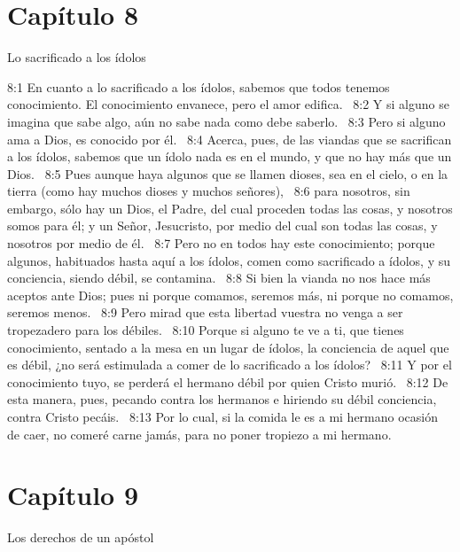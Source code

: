 \section*{Capítulo 8}
Lo sacrificado a los ídolos  

8:1 En cuanto a lo sacrificado a los ídolos, sabemos que todos tenemos conocimiento. El conocimiento envanece, pero el amor edifica.  
8:2 Y si alguno se imagina que sabe algo, aún no sabe nada como debe saberlo.  
8:3 Pero si alguno ama a Dios, es conocido por él.  
8:4 Acerca, pues, de las viandas que se sacrifican a los ídolos, sabemos que un ídolo nada es en el mundo, y que no hay más que un Dios.  
8:5 Pues aunque haya algunos que se llamen dioses, sea en el cielo, o en la tierra (como hay muchos dioses y muchos señores),  
8:6 para nosotros, sin embargo, sólo hay un Dios, el Padre, del cual proceden todas las cosas, y nosotros somos para él; y un Señor, Jesucristo, por medio del cual son todas las cosas, y nosotros por medio de él.  
8:7 Pero no en todos hay este conocimiento; porque algunos, habituados hasta aquí a los ídolos, comen como sacrificado a ídolos, y su conciencia, siendo débil, se contamina.  
8:8 Si bien la vianda no nos hace más aceptos ante Dios; pues ni porque comamos, seremos más, ni porque no comamos, seremos menos.  
8:9 Pero mirad que esta libertad vuestra no venga a ser tropezadero para los débiles.  
8:10 Porque si alguno te ve a ti, que tienes conocimiento, sentado a la mesa en un lugar de ídolos, la conciencia de aquel que es débil, ¿no será estimulada a comer de lo sacrificado a los ídolos?  
8:11 Y por el conocimiento tuyo, se perderá el hermano débil por quien Cristo murió.  
8:12 De esta manera, pues, pecando contra los hermanos e hiriendo su débil conciencia, contra Cristo pecáis.  
8:13 Por lo cual, si la comida le es a mi hermano ocasión de caer, no comeré carne jamás, para no poner tropiezo a mi hermano.  
\section*{Capítulo 9}
Los derechos de un apóstol  

